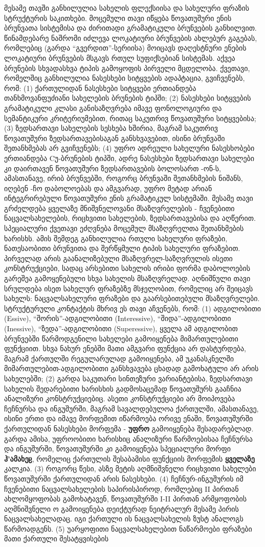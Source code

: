 \begin{otherlanguage}{georgian}
	მესამე თავში განხილულია სახელის ფლექსიისა და სახელური ფრაზის სტრუქტურის საკითხები. მოცემული თავი იწყება წოვათუშური ენის ბრუნვათა სისტემისა და ძირითადი გრამატიკული ბრუნვების განხილვით. წინამდებარე ნაშრომი იძლევა ლოკატიური ბრუნვების ახლებურ გაგებას, რომლებიც (გარდა “გვერდით”-სერიისა) მოიცავს დაღესტნური ენების ლოკატიური ბრუნვების მსგავს რთულ სუფიქსებიან სისტემას. აქვეა ბრუნების სხვადასხვა ტიპის გამოყოფის პირველი მცდელობა. ქვეთავი, რომელშიც განხილულია ნასესხები სიტყვების ადაპტაცია, გვიჩვენებს, რომ: (1) ქართულიდან ნასესხები სიტყვები ერთიანდება თანხმოვანფუძიანი სახელების ბრუნების ტიპში; (2) ნასესხები სიტყვების გრამატიკული კლასი განისაზღვრება იმავე ფონოლოგიური და სემანტიკური კრიტერიუმებით, რითაც საკუთრივ წოვათუშური სიტყვებისა; (3) ზედსართავი სახელების სესხება ხშირია, მაგრამ საკუთრივ წოვათუშური ზედსართავებისაგან განსხვავებით, ისინი ბრუნვაში შეთანხმებას არ გვიჩვენებს; (4) უფრო ადრეული სახელური ნასესხობები ერთიანდება Cუ-ბრუნების ტიპში, ადრე ნასესხები ზედსართავი სახელები კი დაირთავენ წოვათუშური ზედსართავების ბოლოსართ -ონ-ს, ამასთანავე, ირიბ ბრუნვებში, როგორც ბრუნვაში შეთანხმების ნიშანს, იღებენ -ჩო დაბოლოებას და ამგვარად, უფრო მეტად არიან ინტეგრირებული წოვათუშური ენის გრამატიკულ სისტემაში. მესამე თავი გრძელდება ყველაზე მნიშვნელოვანი მსაზღვრელების - ჩვენებითი ნაცვალსახელების, რიცხვითი სახელების, ზედსართავებისა და აღწერით. სპეციალური ქვეთავი ეძღვნება მოცემულ მსაზღვრელთა შეთანხმების ხარისხს. ამის შემდეგ განხილულია რთული სახელური ფრაზები, ნათესაობითი ბრუნვითა და შერწყმული ტიპის სახელური ფრაზებით. პირველად არის გაანალიზებული  მსაზღვრელ-საზღვრულის ისეთი კონსტრუქციები, სადაც არსებითი სახელის ირიბი ფორმა დაბოლოების გარეშეა გამოყენებული სხვა სახელის მსაზღვრელად. აღნიშნული თავი სრულდება ისეთ სახელურ ფრაზებზე მსჯელობით, რომელიც არ შეიცავს სახელს: ნაცვალსახელური ფრაზები და გაარსებითებული მსაზღვრელები. სტრუქტურული კონტაქტის მხრივ ეს თავი აჩვენებს, რომ: (1) ადგილობითი (Essive), “შორის”-ადგილობითი (Interessive), “შიდა”-ადგილობითი (Inessive), “ზედა”-ადგილობითი (Superessive), ყველა ამ ადგილობით ბრუნვებში წარმოდგენილი სახელები გამოიყენება მიმართულებითი  ფუნქციით. სხვა ნახურ ენებში მათი ამგვარი ფუნქცია არ დასტურდება, მაგრამ ქართულში რეგულარულად გამოიყენება, ამ უკანასკნელში მიმართულებით-ადგილობითი განსხვავება ცხადად გამოხატული არ არის სახელებში; (2) გარდა  საკუთარი სინთეზური ვარიანტებისა, ზედსართავი სახელის შედარებითი ხარისხის გადმოსაცემად წოვათუშურს გააჩნია ანალიზური კონსტრუქციებიც. ასეთი კონსტრუქციები არ მოიპოვება ჩეჩნურსა და ინგუშურში, მაგრამ სავალდებულოა ქართულში, ამასთანავე, ისინი ერთი და იმავე მორფემით იწარმოება ორივე ენაში, წოვათუშურში ქართულიდან ნასესხები მორფემა - \textbf{უფრო} გამოიყენება შესადარებლად. გარდა ამისა, უფროობითი ხარისხიც ანალიზური წარმოებისაა ჩეჩნურსა და ინგუშურში, წოვათუშურში კი  გამოიყენება სპეციალური მორფი \textbf{ჰ'ამახეჸ}, რომელიც ქართულის შესაბამისი ფუნქციის მორფემის \textbf{ყველაზე} კალკია. (3) როგორც წესი, ასზე მეტის აღმნიშვნელი რიცხვითი სახელები წოვათუშურში ქართულიდან არის ნასესხები. (4) ჩეჩნურ-ინგუშურის იმ  ჩვენებითი ნაცვალსახელების საპირისპიროდ, რომლებიც II პირთან ახლომყოფობას გამოხატავენ, წოვათუშურში   I-II პირთან არმყოფობის აღმნიშვნელი ო  გამოიყენება დეიქტურად ნეიტრალურ მესამე პირის ნაცვალსახელადაც. იგი  ქართული ის ნაცვალსახელის ზუსტ ანალოგს წარმოადგენს. (5) უარყოფითი ნაცვალსახელებით ნაწარმოები ფრაზები მათი ქართული შესატყვისების 
\end{otherlanguage}
